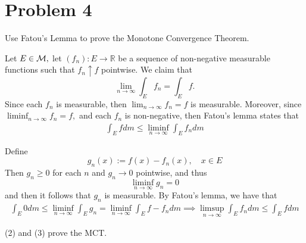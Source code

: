 \documentclass[11pt]{article}
\newcommand{\bbR}{\mathbb{R}}
\begin{document}
\section*{Problem 4}
\begin{problem}
    Use Fatou's Lemma to prove the Monotone Convergence Theorem.
\end{problem}
\begin{solution}
    Let $E\in \cal M,$ let $(f_n): E\to \bbR$ be a sequence of non-negative measurable functions such that $f_n \uparrow f$ pointwise. We claim that 
    \[\lim_{n\to \infty} \int_E f_n = \int_E f.\] 
    Since each $f_n$ is measurable, then $\displaystyle\lim_{n\to \infty}f_n = f$ is measurable. Moreover, since $\displaystyle\liminf_{n\to \infty}f_n = f,$ and each $f_n$ is non-negative, then Fatou's lemma states that 
    \begin{align}
    \int_E f dm \leq \liminf_{n\to \infty} \int_E f_n    dm
    \end{align}
    
    
    
    Define 
    \[g_n(x):= f(x)- f_n(x), \quad x\in E\] Then $g_n \geq 0$ for each $n$ and $g_n \to 0$ pointwise, and thus \[\liminf_{n\to \infty} g_n = 0\]  and then it follows that $g_n$ is measurable. By Fatou's lemma, we have that 
    \begin{align}
    \int_E 0dm \leq \liminf_{n\to \infty}\int_E g_n = \liminf_{n\to \infty}\int_E f - f_n dm \implies \limsup_{n\to \infty}\int_E f_n dm \leq \int_Ef dm    
    \end{align}

    (2) and (3) prove the MCT.    
\end{solution}


\newpage
\end{document}
